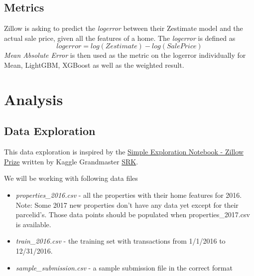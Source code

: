 \documentclass[a4paper]{article}
\begin{document}
\subsection{Metrics}
%
%
Zillow is asking to predict the \textit{logerror} between their Zestimate model and the
actual sale price, given all the features of a home. The \textit{logerror} is defined as
\[ logerror = log(Zestimate) - log(SalePrice) \]
\textit{Mean Absolute Error} is then used as the metric on the logerror individually for Mean, LightGBM, XGBoost as well
as the weighted result.


\section{Analysis}

\subsection{Data Exploration}
This data exploration is inspired by the
\href{https://www.kaggle.com/sudalairajkumar/simple-exploration-notebook-zillow-prize}{Simple Exploration Notebook - Zillow Prize}
written by Kaggle Grandmaster \href{https://www.kaggle.com/sudalairajkumar}{SRK}.

We will be working with following data files
\begin{itemize}
    \item \textit{properties\_2016.csv} - all the properties with their home features for 2016. Note: Some 2017 new 
    properties don't have any data yet except for their parcelid's. Those data points should be populated when
    properties\_2017.csv is available.
    \item \textit{train\_2016.csv} - the training set with transactions from 1/1/2016 to 12/31/2016.
    \item \textit{sample\_submission.csv} - a sample submission file in the correct format
\end{itemize}
\end{document}
